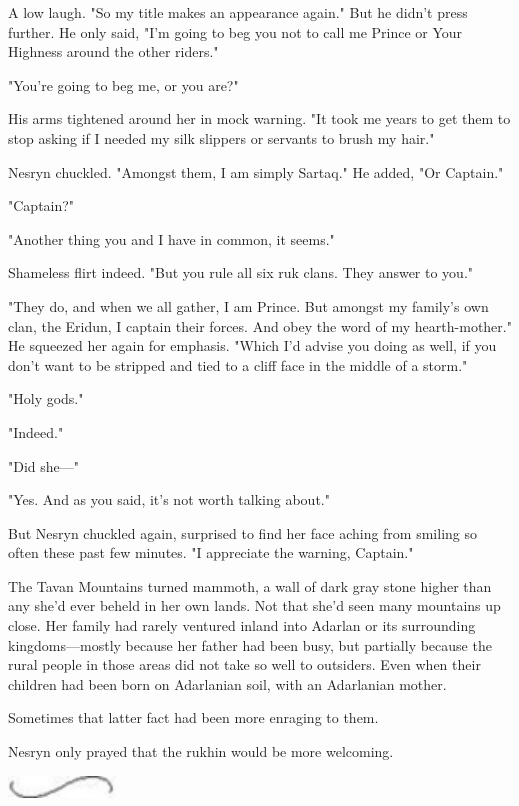 A low laugh. "So my title makes an appearance again." But he didn't press further. He only said, "I'm going to beg you not to call me Prince or Your Highness around the other riders."

"You're going to beg me, or you are?"

His arms tightened around her in mock warning. "It took me years to get them to stop asking if I needed my silk slippers or servants to brush my hair."

Nesryn chuckled. "Amongst them, I am simply Sartaq." He added, "Or Captain."

"Captain?"

"Another thing you and I have in common, it seems."

Shameless flirt indeed. "But you rule all six ruk clans. They answer to you."

"They do, and when we all gather, I am Prince. But amongst my family's own clan, the Eridun, I captain their forces. And obey the word of my hearth-mother." He squeezed her again for emphasis. "Which I'd advise you doing as well, if you don't want to be stripped and tied to a cliff face in the middle of a storm."

"Holy gods."

"Indeed."

"Did she---"

"Yes. And as you said, it's not worth talking about."

But Nesryn chuckled again, surprised to find her face aching from smiling so often these past few minutes. "I appreciate the warning, Captain."

The Tavan Mountains turned mammoth, a wall of dark gray stone higher than any she'd ever beheld in her own lands. Not that she'd seen many mountains up close. Her family had rarely ventured inland into Adarlan or its surrounding kingdoms---mostly because her father had been busy, but partially because the rural people in those areas did not take so well to outsiders. Even when their children had been born on Adarlanian soil, with an Adarlanian mother.

Sometimes that latter fact had been more enraging to them.

Nesryn only prayed that the rukhin would be more welcoming.

\includegraphics[width=1.12in,height=0.24in]{images/seperator}

